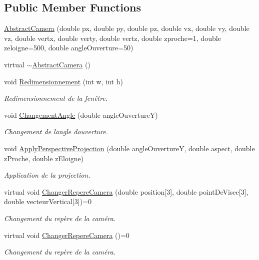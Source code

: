 \subsection*{Public Member Functions}
\begin{DoxyCompactItemize}
\item 
\hyperlink{class_abstract_camera_a66df51ce45fb8be484c56161fe326129}{Abstract\+Camera} (double px, double py, double pz, double vx, double vy, double vz, double vertx, double verty, double vertz, double zproche=1, double zeloigne=500, double angle\+Ouverture=50)
\item 
virtual \hyperlink{class_abstract_camera_addf550f9f41d04bd6651b19d795bdabe}{$\sim$\+Abstract\+Camera} ()
\item 
void \hyperlink{class_abstract_camera_a7231574aecbb95374f3b6f82349608a4}{Redimensionnement} (int w, int h)
\begin{DoxyCompactList}\small\item\em Redimensionnement de la fenêtre. \end{DoxyCompactList}\item 
void \hyperlink{class_abstract_camera_a14ae54182b566740e1285ad33dfc6b2b}{Changement\+Angle} (double angle\+OuvertureY)
\begin{DoxyCompactList}\small\item\em Changement de l\textquotesingle{}angle d\textquotesingle{}ouverture. \end{DoxyCompactList}\item 
void \hyperlink{class_abstract_camera_a2685cf0a29e7dac3ca7c8b6d6b545810}{Apply\+Perspective\+Projection} (double angle\+OuvertureY, double aspect, double z\+Proche, double z\+Eloigne)
\begin{DoxyCompactList}\small\item\em Application de la projection. \end{DoxyCompactList}\item 
virtual void \hyperlink{class_abstract_camera_aeaa6522c54a923a50137d2c0ca54238b}{Changer\+Repere\+Camera} (double position\mbox{[}3\mbox{]}, double point\+De\+Visee\mbox{[}3\mbox{]}, double vecteur\+Vertical\mbox{[}3\mbox{]})=0
\begin{DoxyCompactList}\small\item\em Changement du repère de la caméra. \end{DoxyCompactList}\item 
virtual void \hyperlink{class_abstract_camera_a4bfcc6ed8980d64cf1d43d7dcb60129b}{Changer\+Repere\+Camera} ()=0
\begin{DoxyCompactList}\small\item\em Changement du repère de la caméra. \end{DoxyCompactList}\item 

\end{DoxyCompactItemize}
